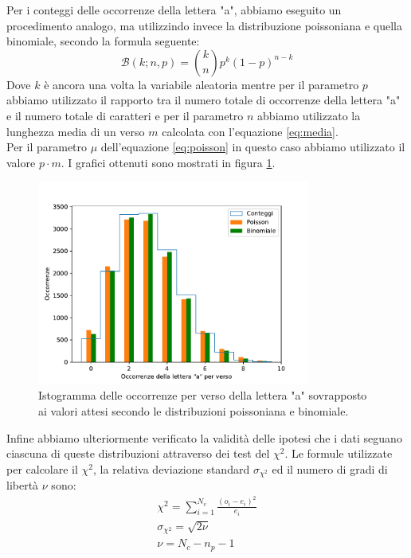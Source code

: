 \documentclass[a4paper]{article}
\begin{document}
        Per i conteggi delle occorrenze della lettera "a", abbiamo eseguito un procedimento
        analogo, ma utilizzindo invece la distribuzione poissoniana e quella binomiale,
        secondo la formula seguente:
        \begin{equation}
            \mathcal{B}(k;n,p) = \binom{k}{n}p^{k}\left( 1-p \right) ^{n-k}\label{eq:binom}
        \end{equation}
        Dove $k$ è ancora una volta la variabile aleatoria mentre per il parametro $p$ 
        abbiamo utilizzato il rapporto tra il numero totale di occorrenze della lettera
        "a" e il numero totale di caratteri e per il parametro $n$ abbiamo
        utilizzato la lunghezza media di un verso $m$ calcolata con l'equazione \ref{eq:media}.\\
        Per il parametro $\mu$ dell'equazione \ref{eq:poisson} in questo caso abbiamo utilizzato
        il valore $p\cdot m$. I grafici ottenuti sono mostrati in figura \ref{fig:frequenza_a}.\\
    \begin{figure}[ht!]
        \centering
        \includegraphics[width=0.8\textwidth]{extra/frequenza_a.pdf}
        \caption{Istogramma delle occorrenze per verso della lettera "a" sovrapposto ai valori
        attesi secondo le distribuzioni poissoniana e binomiale.}
        \label{fig:frequenza_a}
    \end{figure}
        Infine abbiamo ulteriormente verificato la validità delle ipotesi che i dati seguano ciascuna
        di queste distribuzioni attraverso dei test del $\chi^2$. 
        Le formule utilizzate per calcolare il $\chi^2$, la relativa deviazione standard
        $\sigma_{\chi^2}$ ed il numero di gradi di libertà $\nu$ sono:
        \begin{gather}
            \chi^2=\sum_{i=1}^{N_v} \frac{\left( o_i - e_i \right)^2 }{e_i}\\
            \sigma_{\chi^2} = \sqrt{2\nu} \\
            \nu=N_c-n_p-1
        \end{gather}
\end{document}
